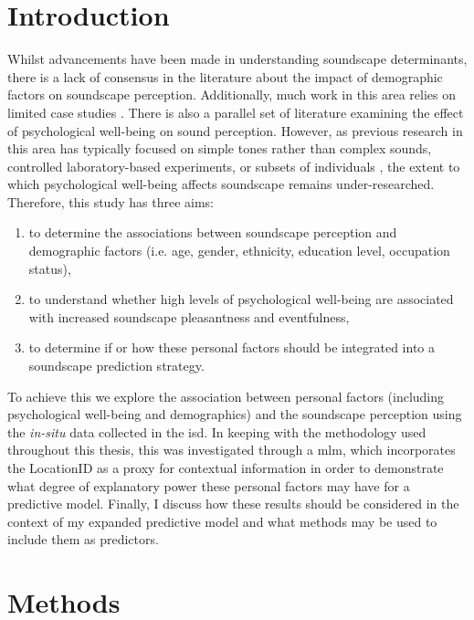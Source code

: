 \section{Introduction}

Whilst advancements have been made in understanding soundscape determinants, there is a lack of consensus in the literature about the impact of demographic factors on soundscape perception. Additionally, much work in this area relies on limited case studies \citep{Fang2021Soundscape,Ismail2014Sound,Yang2005Soundscape}. There is also a parallel set of literature examining the effect of psychological well-being on sound perception. However, as previous research in this area has typically focused on simple tones rather than complex sounds, controlled laboratory-based experiments, or subsets of individuals \citep{Laufer2016Behavioral,Riskind2014Influence}, the extent to which psychological well-being affects soundscape remains under-researched. Therefore, this study has three aims:

\begin{enumerate}
  \item to determine the associations between soundscape perception and demographic factors (i.e. age, gender, ethnicity, education level, occupation status),
  \item  to understand whether high levels of psychological well-being are associated with increased soundscape pleasantness and eventfulness,
  \item to determine if or how these personal factors should be integrated into a soundscape prediction strategy.
\end{enumerate}

To achieve this we explore the association between personal factors (including psychological well-being and demographics) and the soundscape perception using the \emph{in-situ} data collected in the \gls{isd}. In keeping with the methodology used throughout this thesis, this was investigated through a \gls{mlm}, which incorporates the LocationID as a proxy for contextual information in order to demonstrate what degree of explanatory power these personal factors may have for a predictive model. Finally, I discuss how these results should be considered in the context of my expanded predictive model and what methods may be used to include them as predictors.

\section{Methods}

